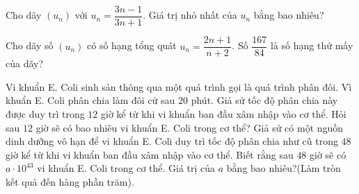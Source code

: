 \begin{ex}%
	Cho dãy $(u_n)$ với $u_n=\dfrac{3n-1}{3n+1}$. Giá trị nhỏ nhất của $u_n$ bằng bao  nhiêu?
\end{ex}

\begin{ex}%
	Cho dãy số $(u_n)$ có số hạng tổng quát $u_n=\dfrac{2 n+1}{n+2}$. Số $\dfrac{167}{84}$ là số hạng thứ mấy của dãy? 
\end{ex}

\begin{ex}%
	Vi khuẩn E. Coli sinh sản thông qua một quá trình gọi là quá trình phân đôi. Vì khuẩn E. Coli phân chia làm đôi cứ sau $20$ phút. Giả sử tốc độ phân chia này được duy trì trong $12$ giờ kể từ khi vi khuẩn ban đầu xâm nhập vào cơ thể. Hỏi sau $12$ giờ sẽ có bao nhiêu vi khuẩn E. Coli trong cơ thể? Giả sử có một nguồn dinh dưỡng vô hạn để vi khuẩn E. Coli duy trì tốc độ phân  chia như cũ trong $48$ giờ kể từ khi vi khuẩn ban đầu xâm nhập vào cơ thể. Biết rằng sau $48$ giờ sẽ có $a \cdot 10^{43}$ vi khuẩn E. Coli trong cơ thể. Giá trị của $a$ bằng bao nhiêu?(Làm tròn kết quả đến hàng phần trăm).
\end{ex}

